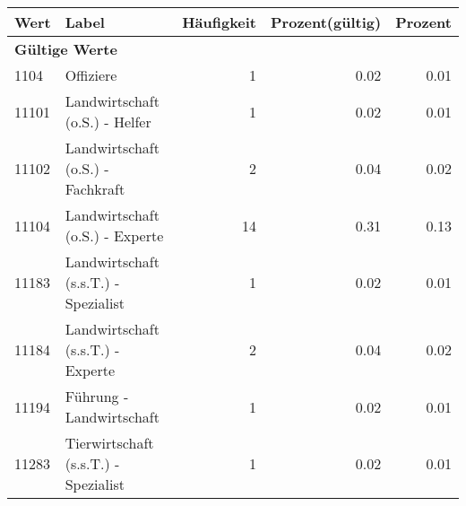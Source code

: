      \begin{longtable}{lXrrr}
     \toprule
     \textbf{Wert} & \textbf{Label} & \textbf{Häufigkeit} & \textbf{Prozent(gültig)} & \textbf{Prozent} \\
     \endhead
     \midrule
     \multicolumn{5}{l}{\textbf{Gültige Werte}}\\
        1104 & \multicolumn{1}{X}{Offiziere} & %
          \num{1} &
          \num[round-mode=places,round-precision=2]{0,02} &
          \num[round-mode=places,round-precision=2]{0,01} \\
        11101 & \multicolumn{1}{X}{Landwirtschaft (o.S.) - Helfer} & %
          \num{1} &
          \num[round-mode=places,round-precision=2]{0,02} &
          \num[round-mode=places,round-precision=2]{0,01} \\
        11102 & \multicolumn{1}{X}{Landwirtschaft (o.S.) - Fachkraft} & %
          \num{2} &
          \num[round-mode=places,round-precision=2]{0,04} &
          \num[round-mode=places,round-precision=2]{0,02} \\
        11104 & \multicolumn{1}{X}{Landwirtschaft (o.S.) - Experte} & %
          \num{14} &
          \num[round-mode=places,round-precision=2]{0,31} &
          \num[round-mode=places,round-precision=2]{0,13} \\
        11183 & \multicolumn{1}{X}{Landwirtschaft (s.s.T.) - Spezialist} & %
          \num{1} &
          \num[round-mode=places,round-precision=2]{0,02} &
          \num[round-mode=places,round-precision=2]{0,01} \\
        11184 & \multicolumn{1}{X}{Landwirtschaft (s.s.T.) - Experte} & %
          \num{2} &
          \num[round-mode=places,round-precision=2]{0,04} &
          \num[round-mode=places,round-precision=2]{0,02} \\
        11194 & \multicolumn{1}{X}{Führung - Landwirtschaft} & %
          \num{1} &
          \num[round-mode=places,round-precision=2]{0,02} &
          \num[round-mode=places,round-precision=2]{0,01} \\
        11283 & \multicolumn{1}{X}{Tierwirtschaft (s.s.T.) - Spezialist} & %
          \num{1} &
          \num[round-mode=places,round-precision=2]{0,02} &
          \num[round-mode=places,round-precision=2]{0,01} \\

\end{longtable}
